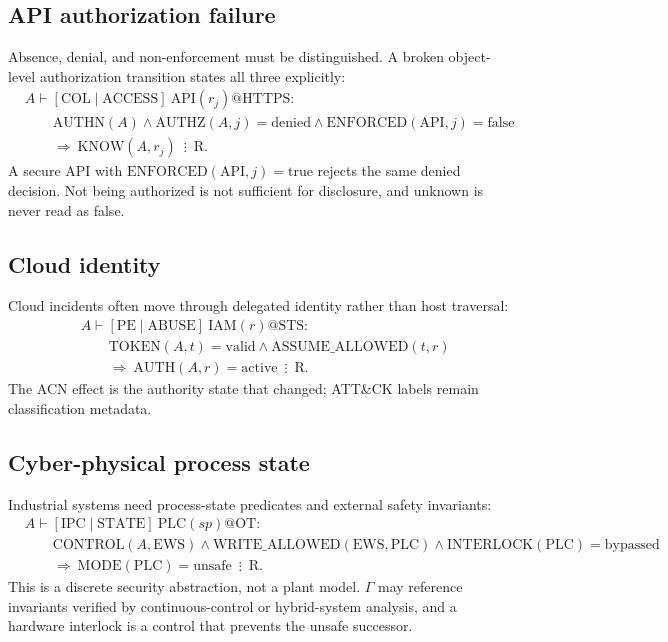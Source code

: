 \documentclass[11pt,letterpaper]{article}
\theoremstyle{definition}
\newcommand{\Inv}{\Gamma}
\newcommand{\evsep}{\mathrel{\vdots}}
\begin{document}
\subsection{API authorization failure}

Absence, denial, and non-enforcement must be distinguished. A broken object-level authorization transition states all three explicitly:
\begin{equation}
\begin{aligned}
&A\vdash[\mathrm{COL}\mid\mathrm{ACCESS}]\ \mathrm{API}(r_j)@\mathrm{HTTPS}:\\
&\qquad \mathrm{AUTHN}(A)\wedge\mathrm{AUTHZ}(A,j)=\mathrm{denied}\wedge\mathrm{ENFORCED}(\mathrm{API},j)=\mathrm{false}\\
&\qquad\Rightarrow\ \mathrm{KNOW}(A,r_j)\ \evsep\ \mathrm{R}.
\end{aligned}
\end{equation}
A secure API with $\mathrm{ENFORCED}(\mathrm{API},j)=\mathrm{true}$ rejects the same denied decision. Not being authorized is not sufficient for disclosure, and unknown is never read as false.

\subsection{Cloud identity}

Cloud incidents often move through delegated identity rather than host traversal:
\begin{equation}
\begin{aligned}
&A\vdash[\mathrm{PE}\mid\mathrm{ABUSE}]\ \mathrm{IAM}(r)@\mathrm{STS}:\\
&\qquad \mathrm{TOKEN}(A,t)=\mathrm{valid}\wedge\mathrm{ASSUME\_ALLOWED}(t,r)\\
&\qquad\Rightarrow\ \mathrm{AUTH}(A,r)=\mathrm{active}\ \evsep\ \mathrm{R}.
\end{aligned}
\end{equation}
The ACN effect is the authority state that changed; ATT\&CK labels remain classification metadata.

\subsection{Cyber-physical process state}

Industrial systems need process-state predicates and external safety invariants:
\begin{equation}
\begin{aligned}
&A\vdash[\mathrm{IPC}\mid\mathrm{STATE}]\ \mathrm{PLC}(\mathit{sp})@\mathrm{OT}:\\
&\qquad \mathrm{CONTROL}(A,\mathrm{EWS})\wedge\mathrm{WRITE\_ALLOWED}(\mathrm{EWS},\mathrm{PLC})\wedge\mathrm{INTERLOCK}(\mathrm{PLC})=\mathrm{bypassed}\\
&\qquad\Rightarrow\ \mathrm{MODE}(\mathrm{PLC})=\mathrm{unsafe}\ \evsep\ \mathrm{R}.
\end{aligned}
\end{equation}
This is a discrete security abstraction, not a plant model. $\Inv$ may reference invariants verified by continuous-control or hybrid-system analysis, and a hardware interlock is a control that prevents the unsafe successor.
\end{document}
